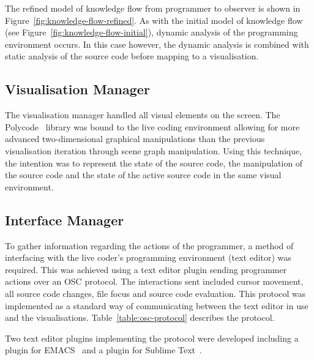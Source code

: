 The refined model of knowledge flow from programmer to observer is shown in Figure~\ref{fig:knowledge-flow-refined}. As with the initial model of knowledge flow (see Figure~\ref{fig:knowledge-flow-initial}), dynamic analysis of the programming environment occurs. In this case however, the dynamic analysis is combined with static analysis of the source code before mapping to a visualisation.

\subsection{Visualisation Manager}

The visualisation manager handled all visual elements on the screen. The Polycode~\cite{Safrin2013} library was bound to the live coding environment allowing for more advanced two-dimensional graphical manipulations than the previous visualisation iteration through scene graph manipulation. Using this technique, the intention was to represent the state of the source code, the manipulation of the source code and the state of the active source code in the same visual environment.

\subsection{Interface Manager}
\label{sec:interface-manager}

To gather information regarding the actions of the programmer, a method of interfacing with the live coder's programming environment (text editor) was required. This was achieved using a text editor plugin sending programmer actions over an \ac{OSC} protocol. The interactions sent included cursor movement, all source code changes, file focus and source code evaluation. This protocol was implemented as a standard way of communicating between the text editor in use and the visualisations. Table~\ref{table:osc-protocol} describes the protocol.

Two text editor plugins implementing the protocol were developed including a plugin for EMACS~\cite{Stallman1981} and a plugin for Sublime Text~\cite{Skinner2013}.

